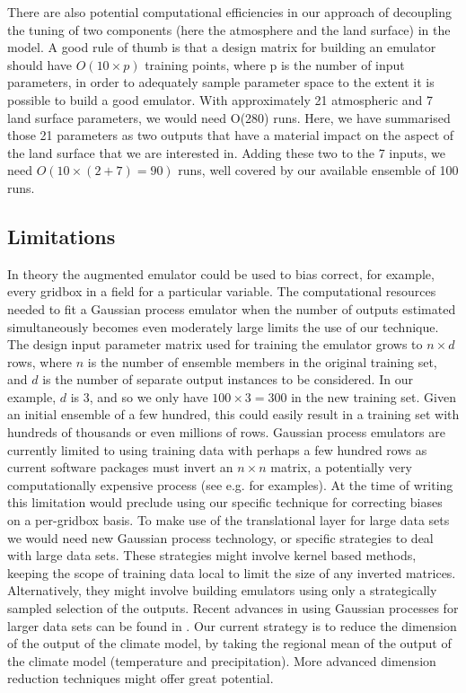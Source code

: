 \documentclass[gmd, manuscript]{copernicus}
\begin{document}
There are also potential computational efficiencies in our approach of decoupling the tuning of two components (here the atmosphere and the land surface) in the model. A good rule of thumb is that a design matrix for building an emulator should have $O(10 \times p)$ training points, where p is the number of input parameters, in order to adequately sample parameter space to the extent it is possible to build a good emulator. With approximately 21 atmospheric and 7 land surface parameters, we would need O(280) runs. Here, we have summarised those 21 parameters as two outputs that have a material impact on the aspect of the land surface that we are interested in. Adding these two to the 7 inputs, we need $O(10 \times (2+7) = 90)$ runs, well covered by our available ensemble of 100 runs. 

\subsection{Limitations}
In theory the augmented emulator could be used to bias correct, for example, every gridbox in a field for a particular variable. The computational resources needed to fit a Gaussian process emulator when the number of outputs estimated simultaneously becomes even moderately large limits the use of our technique. The design input parameter matrix used for training the emulator grows to $n \times d$ rows, where $n$ is the number of ensemble members in the original training set, and $d$ is the number of separate output instances to be considered. In our example, $d$ is 3, and so we only have $100 \times 3 = 300$ in the new training set. Given an initial ensemble of a few hundred, this could easily result in a training set with hundreds of thousands or even millions of rows. Gaussian process emulators are currently limited to using training data with perhaps a few hundred rows as current software packages must invert an $n \times n$ matrix, a potentially very computationally expensive process (see e.g. \cite{hensman2013gaussian} for examples). At the time of writing this limitation would preclude using our specific technique for correcting biases on a per-gridbox basis. To make use of the translational layer for large data sets we would need new Gaussian process technology, or specific strategies to deal with large data sets. These strategies might involve kernel based methods, keeping the scope of training data local to limit the size of any inverted matrices. Alternatively, they might involve building emulators using only a strategically sampled selection of the outputs. Recent advances in using Gaussian processes for larger data sets can be found in \cite{hensman2013gaussian, hensman2015scalable, wilson2015thoughts,wilson2015kernel}. Our current strategy is to reduce the dimension of the output of the climate model, by taking the regional mean of the output of the climate model (temperature and precipitation). More advanced dimension reduction techniques might offer great potential.
\end{document}
